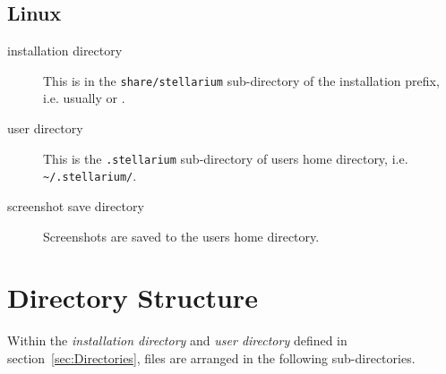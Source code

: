 \subsection{Linux}
\label{sec:FilesAndDirectories:Linux}

\begin{description}
\item[installation directory] This is in the
  \texttt{share/stellarium} sub-directory of the installation prefix,
  i.e. usually  or
  .
\item[user directory] This is the \texttt{.stellarium} sub-directory
  of users home directory, i.e. \texttt{\textasciitilde{}/.stellarium/}.
\item[screenshot save directory] Screenshots are saved to the users
  home directory.
\end{description}

\section{Directory Structure}
\label{sec:FilesAndDirectories:DirectoryStructure}

Within the \emph{installation directory} and \emph{user directory}
defined in section~\ref{sec:Directories}, files are arranged in the
following sub-directories.

